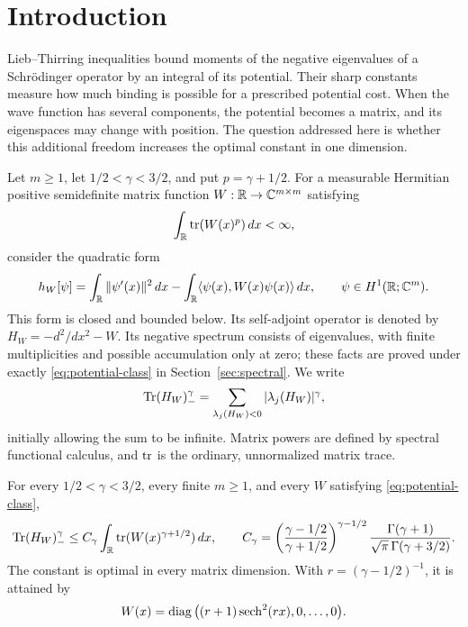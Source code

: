 \section{Introduction}\label{sec:introduction}

Lieb--Thirring inequalities bound moments of the negative eigenvalues of a Schr\"odinger operator by an integral of its potential. Their sharp constants measure how much binding is possible for a prescribed potential cost. When the wave function has several components, the potential becomes a matrix, and its eigenspaces may change with position. The question addressed here is whether this additional freedom increases the optimal constant in one dimension.

Let $m\ge1$, let $1/2<\gamma<3/2$, and put $p=\gamma+1/2$.
For a measurable Hermitian positive semidefinite matrix function
$W:\mathbb R\to\mathbb C^{m\times m}$ satisfying
\begin{equation}\label{eq:potential-class}
  \int_\mathbb R\operatorname{tr}(W(x)^p)\,dx<\infty,
\end{equation}
consider the quadratic form
\begin{equation}\label{eq:schrodinger-form}
 h_W[\psi]=\int_\mathbb R\|\psi'(x)\|^2\,dx
       -\int_\mathbb R\langle\psi(x),W(x)\psi(x)\rangle\,dx,
 \qquad \psi\in H^1(\mathbb R;\mathbb C^m).
\end{equation}
This form is closed and bounded below. Its self-adjoint operator is denoted by
$H_W=-d^2/dx^2-W$. Its negative spectrum consists of eigenvalues, with finite
multiplicities and possible accumulation only at zero; these facts are proved
under exactly \eqref{eq:potential-class} in Section~\ref{sec:spectral}.
We write
\[
 \operatorname{Tr}(H_W)_-^\gamma=\sum_{\lambda_j(H_W)<0}|\lambda_j(H_W)|^\gamma,
\]
initially allowing the sum to be infinite. Matrix powers are defined by spectral
functional calculus, and $\operatorname{tr}$ is the ordinary, unnormalized matrix trace.

\begin{theorem}\label{thm:main}
For every $1/2<\gamma<3/2$, every finite $m\ge1$, and every $W$ satisfying
\eqref{eq:potential-class},
\begin{equation}\label{eq:main-bound}
 \operatorname{Tr}(H_W)_-^\gamma\le C_\gamma\int_\mathbb R\operatorname{tr}(W(x)^{\gamma+1/2})\,dx,
 \qquad
 C_\gamma=
 \left(\frac{\gamma-1/2}{\gamma+1/2}\right)^{\gamma-1/2}
 \frac{\Gamma(\gamma+1)}{\sqrt\pi\,\Gamma(\gamma+3/2)}.
\end{equation}
The constant is optimal in every matrix dimension. With
$r=(\gamma-1/2)^{-1}$, it is attained by
\begin{equation}\label{eq:extremal-potential}
 W(x)=\operatorname{diag}\big((r+1)\operatorname{sech}^2(rx),0,\ldots,0\big).
\end{equation}
\end{theorem}

